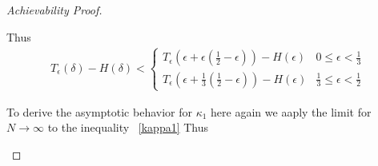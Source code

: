 \begin{proof}[Achievability Proof]
\begin{itemize}
\begin{enumerate}
Thus 
\begin{align}
  T_\epsilon\left(\delta \right)-H\left(\delta \right) <    \begin{cases}
    T_\epsilon\left(\epsilon + \epsilon(\frac{1}{2} - \epsilon) \right)- H\left(\epsilon \right)  & 0 \leq \epsilon < \frac{1}{3}
    \\
    T_\epsilon\left(\epsilon + \frac{1}{3}(\frac{1}{2} - \epsilon) \right) - H\left(\epsilon \right)
     & \frac{1}{3} \leq \epsilon < \frac{1}{2}
    \end{cases}
\end{align}



To derive the asymptotic behavior for $\kappa_1$ here again we aaply the limit for $N \to \infty$ to the inequality ~\eqref{kappa1} Thus


\end{enumerate}
\end{itemize}
\end{proof}
